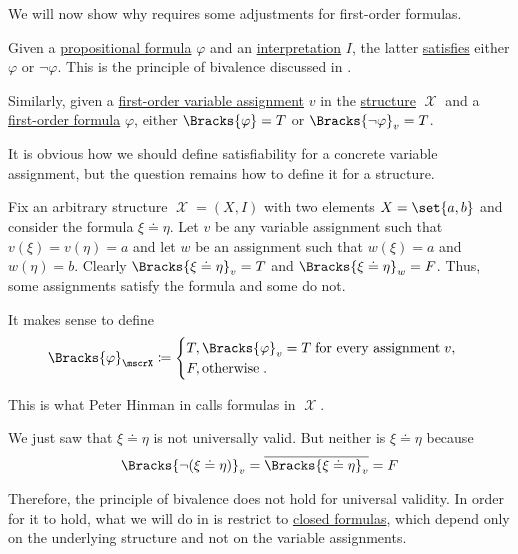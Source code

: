 \begin{remark}\label{rem:first_order_satisfiability_bivalence}
  We will now show why  requires some adjustments for first-order formulas.

  Given a \hyperref[def:propositional_syntax/formula]{propositional formula} \( \varphi \) and an \hyperref[def:propositional_valuation/interpretation]{interpretation} \( I \), the latter \hyperref[def:propositional_model]{satisfies} either \( \varphi \) or \( \neg \varphi \). This is the principle of bivalence discussed in .

  Similarly, given a \hyperref[def:first_order_valuation/variable_assignment]{first-order variable assignment} \( v \) in the \hyperref[def:first_order_structure]{structure} \( \mscrX \) and a \hyperref[def:first_order_syntax/formula]{first-order formula} \( \varphi \), either \( \Bracks{\varphi} = T \) or \( \Bracks{\neg \varphi}_v = T \).

  It is obvious how we should define satisfiability for a concrete variable assignment, but the question remains how to define it for a structure.

  Fix an arbitrary structure \( \mscrX = (X, I) \) with two elements \( X = \set{ a, b } \) and consider the formula \( \xi \doteq \eta \). Let \( v \) be any variable assignment such that \( v(\xi) = v(\eta) = a \) and let \( w \) be an assignment such that \( w(\xi) = a \) and \( w(\eta) = b \). Clearly \( \Bracks{\xi \doteq \eta}_v = T \) and \( \Bracks{\xi \doteq \eta}_w = F \). Thus, some assignments satisfy the formula and some do not.

  It makes sense to define
  \begin{equation*}
    \Bracks{\varphi}_\mscrX
    \coloneqq
    \begin{cases}
      T, \Bracks{\varphi}_v = T \T{for every assignment} v, \\
      F, \T{otherwise}.
    \end{cases}
  \end{equation*}

  This is what Peter Hinman in  calls  formulas in \( \mscrX \).

  We just saw that \( \xi \doteq \eta \) is not universally valid. But neither is \( \xi \doteq \eta \) because
  \begin{equation*}
    \Bracks{\neg (\xi \doteq \eta)}_v = \overline{\Bracks{\xi \doteq \eta}_v} = F
  \end{equation*}

  Therefore, the principle of bivalence does not hold for universal validity. In order for it to hold, what we will do in  is restrict to \hyperref[def:first_order_syntax/closed_formula]{closed formulas}, which depend only on the underlying structure and not on the variable assignments.
\end{remark}


